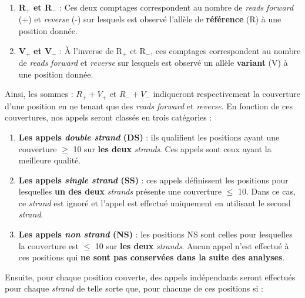 \documentclass[12pt,a4paper,twoside]{ugathesis}
\providecommand{\tightlist}{%
  \setlength{\itemsep}{0pt}\setlength{\parskip}{0pt}}
\theoremstyle{definition}
\theoremstyle{definition}
\theoremstyle{definition}
\theoremstyle{remark}
\begin{document}
\begin{enumerate}
\def\labelenumi{\arabic{enumi}.}
\tightlist
\item
  \textbf{R}\(_+\) \textbf{et R}\(_-\) : Ces deux comptages
  correspondent au nombre de \emph{reads} \emph{forward} (+) et
  \emph{reverse} (-) sur lesquels est observé l'allèle de
  \textbf{référence} (R) à une position donnée.\\
\item
  \textbf{V}\(_+\) \textbf{et V}\(_-\) : À l'inverse de R\(_+\) et
  R\(_-\), ces comptages correspondent au nombre de \emph{reads}
  \emph{forward} et \emph{reverse} sur lesquels est observé un allèle
  \textbf{variant} (V) à une position donnée.
\end{enumerate}

Ainsi, les sommes : \(R_+ + V_+\) et \(R_- + V_-\) indiqueront
respectivement la couverture d'une position en ne tenant que des
\emph{reads forward} et \emph{reverse}. En fonction de ces couvertures,
nos appels seront classés en trois catégories :

\begin{enumerate}
\def\labelenumi{\arabic{enumi}.}
\item
  \textbf{Les appels \emph{double strand} (DS)} : ils qualifient les
  positions ayant une couverture \(\ge\) 10 sur \textbf{les deux}
  \emph{strands}. Ces appels sont ceux ayant la meilleure qualité.
\item
  \textbf{Les appels \emph{single strand} (SS)} : ces appels définissent
  les positions pour lesquelles \textbf{un des deux} \emph{strands}
  présente une couverture \(\le\) 10. Dans ce cas, ce \emph{strand} est
  ignoré et l'appel est effectué uniquement en utilisant le second
  \emph{strand}.
\item
  \textbf{Les appels \emph{non strand} (NS)} : les positions NS sont
  celles pour lesquelles la couverture est \(\le\) 10 sur \textbf{les
  deux} \emph{strands}. Aucun appel n'est effectué à ces positions qui
  \textbf{ne sont pas conservées dans la suite des analyses}.
\end{enumerate}

Ensuite, pour chaque position couverte, des appels indépendants seront
effectués pour chaque \emph{strand} de telle sorte que, pour chacune de
ces positions si :
\end{document}
